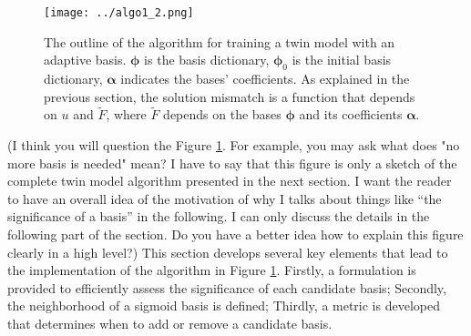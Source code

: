 \begin{figure}
    \begin{center}
        \texttt{[image: ../algo1\_2.png]}
        \caption{The outline of the algorithm for training a twin model with an adaptive basis.
                 $\boldsymbol{\phi}$ is the basis dictionary, $\boldsymbol{\phi}_0$ is the 
                 initial basis dictionary, $\boldsymbol{\alpha}$ indicates the bases' coefficients.
                 As explained in the previous section, the solution mismatch is a function that depends
                 on $u$ and $\tilde{F}$, where $\tilde{F}$ depends on the bases $\boldsymbol{\phi}$
                 and its coefficients $\boldsymbol{\alpha}$.} 
        \label{fig: outline heuristics}
    \end{center}
\end{figure}

(I think you will question the Figure \ref{fig: outline heuristics}. For example, you may ask 
what does "no more basis is needed" mean? I have to say that 
this figure is only a sketch of the complete twin model
algorithm presented in the next section. I want the reader to have an overall idea of the motivation of
why I talks about things like ``the significance of a basis'' in the following. 
I can only discuss the details in the following part of the section. 
Do you have a better idea how to explain this figure clearly in a high level?)
This section develops several key 
elements that lead to the implementation of the algorithm in Figure \ref{fig: outline heuristics}.
Firstly, a formulation is provided to efficiently assess the 
significance of each candidate basis; Secondly, 
the neighborhood of a sigmoid basis is defined;
Thirdly, a metric is developed that determines when to add or remove a candidate basis.\\

